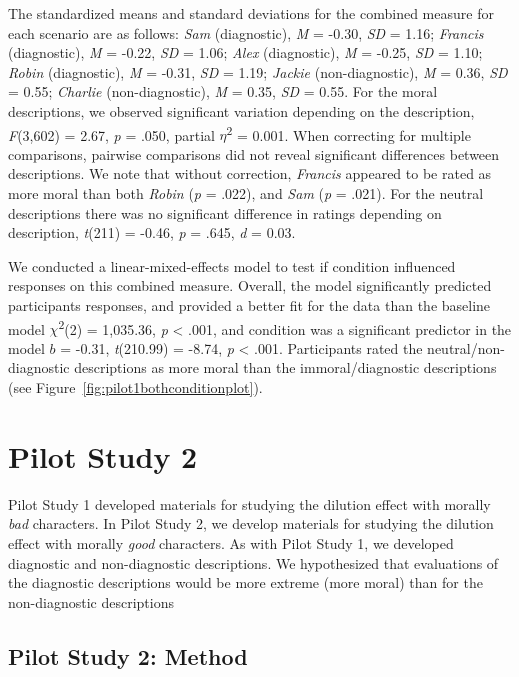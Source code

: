\documentclass[
  man,floatsintext]{apa6}
\begin{document}
The standardized means and standard deviations for the combined measure for each scenario are as follows:
\emph{Sam} (diagnostic),
\emph{M} = -0.30, \emph{SD} = 1.16;
\emph{Francis} (diagnostic),
\emph{M} = -0.22, \emph{SD} = 1.06;
\emph{Alex} (diagnostic),
\emph{M} = -0.25, \emph{SD} = 1.10;
\emph{Robin} (diagnostic),
\emph{M} = -0.31, \emph{SD} = 1.19;
\emph{Jackie} (non-diagnostic),
\emph{M} = 0.36, \emph{SD} = 0.55;
\emph{Charlie} (non-diagnostic),
\emph{M} = 0.35, \emph{SD} = 0.55. For the moral descriptions, we observed significant variation depending on the description, \emph{F}(3,602) = 2.67, \emph{p} = .050, partial \(\eta\)\textsuperscript{2} = 0.001. When correcting for multiple comparisons, pairwise comparisons did not reveal significant differences between descriptions. We note that without correction, \emph{Francis} appeared to be rated as more moral than both \emph{Robin} (\emph{p} = .022), and \emph{Sam} (\emph{p} = .021). For the neutral descriptions there was no significant difference in ratings depending on description, \emph{t}(211) = -0.46, \emph{p} = .645, \emph{d} = 0.03.

We conducted a linear-mixed-effects model to test if condition influenced responses on this combined measure. Overall, the model significantly predicted participants responses, and provided a better fit for the data than the baseline model \(\chi\)\textsuperscript{2}(2) = 1,035.36, \emph{p} \textless{} .001, and condition was a significant predictor in the model \(b\) = -0.31, \emph{t}(210.99) = -8.74, \emph{p} \textless{} .001. Participants rated the neutral/non-diagnostic descriptions as more moral than the immoral/diagnostic descriptions (see Figure~\ref{fig:pilot1bothconditionplot}).

\pagebreak

\section{Pilot Study 2}\label{pilot-study-2}

Pilot Study 1 developed materials for studying the dilution effect with morally \emph{bad} characters. In Pilot Study 2, we develop materials for studying the dilution effect with morally \emph{good} characters. As with Pilot Study 1, we developed diagnostic and non-diagnostic descriptions. We hypothesized that evaluations of the diagnostic descriptions would be more extreme (more moral) than for the non-diagnostic descriptions

\subsection{Pilot Study 2: Method}\label{pilot-study-2-method}
\end{document}
